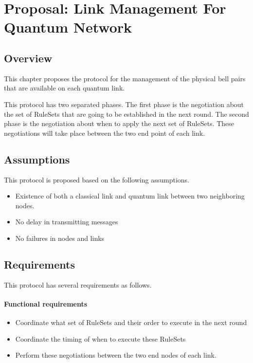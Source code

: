 \chapter{Proposal: Link Management For Quantum Network}
\label{proposal}

\section{Overview}

This chapter proposes the protocol for the management of the physical bell pairs that are available on each quantum link.

This protocol has two separated phases. The first phase is the negotiation about the set of RuleSets that are going to be established in the next round. The second phase is the negotiation about when to apply the next set of RuleSets.
These negotiations will take place between the two end point of each link.

\section{Assumptions}

This protocol is proposed based on the following assumptions.

\begin{itemize}
  \item Existence of both a classical link and quantum link between two neighboring nodes.
  \item No delay in transmitting messages 
  \item No failures in nodes and links
\end{itemize}

\section{Requirements}

This protocol has several requirements as follows.

\subsubsection{Functional requirements}

\begin{itemize}
  \item Coordinate what set of RuleSets and their order to execute in the next round
  \item Coordinate the timing of when to execute these RuleSets
  \item Perform these negotiations between the two end nodes of each link.
\end{itemize}

